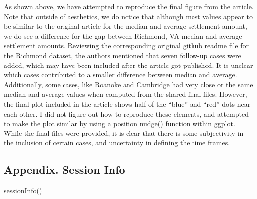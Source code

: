\documentclass[
  letterpaper,
  DIV=11,
  numbers=noendperiod]{scrartcl}
\newenvironment{Shaded}{\begin{snugshade}}{\end{snugshade}}
\newcommand{\FunctionTok}[1]{\textcolor[rgb]{0.28,0.35,0.67}{#1}}
\newcommand{\NormalTok}[1]{\textcolor[rgb]{0.00,0.23,0.31}{#1}}
\begin{document}
As shown above, we have attempted to reproduce the final figure from the
article. Note that outside of aesthetics, we do notice that although
most values appear to be similar to the original article for the median
and average settlement amount, we do see a difference for the gap
between Richmond, VA median and average settlement amounts. Reviewing
the corresponding original github readme file for the Richmond dataset,
the authors mentioned that seven follow-up cases were added, which may
have been included after the article got published. It is unclear which
cases contributed to a smaller difference between median and average.
Additionally, some cases, like Roanoke and Cambridge had very close or
the same median and average values when computed from the shared final
files. However, the final plot included in the article shows half of the
``blue'' and ``red'' dots near each other. I did not figure out how to
reproduce these elements, and attempted to make the plot similar by
using a position nudge() function within ggplot. While the final files
were provided, it is clear that there is some subjectivity in the
inclusion of certain cases, and uncertainty in defining the time frames.

\subsection{Appendix. Session Info}\label{appendix.-session-info}

\begin{Shaded}
\begin{Highlighting}[]
\FunctionTok{sessionInfo}\NormalTok{()}
\end{Highlighting}
\end{Shaded}
\end{document}
